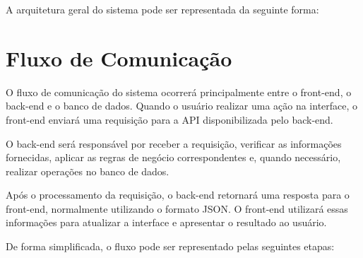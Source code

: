 \documentclass[12pt,a4paper]{report}
\begin{document}
A arquitetura geral do sistema pode ser representada da
seguinte forma:

\begin{center}


\end{center}

\section{Fluxo de Comunicação}

O fluxo de comunicação do sistema ocorrerá principalmente entre
o front-end, o back-end e o banco de dados. Quando o usuário
realizar uma ação na interface, o front-end enviará uma
requisição para a API disponibilizada pelo back-end.

O back-end será responsável por receber a requisição, verificar
as informações fornecidas, aplicar as regras de negócio
correspondentes e, quando necessário, realizar operações no
banco de dados.

Após o processamento da requisição, o back-end retornará uma
resposta para o front-end, normalmente utilizando o formato
JSON. O front-end utilizará essas informações para atualizar a
interface e apresentar o resultado ao usuário.

De forma simplificada, o fluxo pode ser representado pelas
seguintes etapas:
\end{document}
